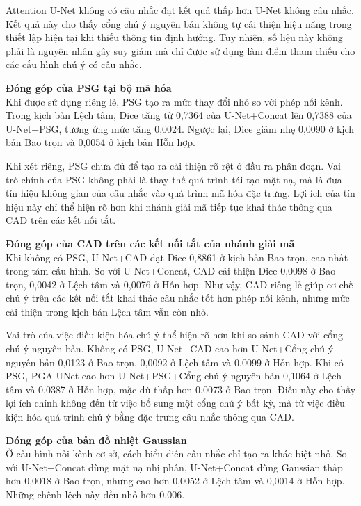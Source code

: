 Attention U-Net không có câu nhắc đạt kết quả thấp hơn U-Net không câu nhắc. Kết quả này cho thấy cổng chú ý nguyên bản không tự cải thiện hiệu năng trong thiết lập hiện tại khi thiếu thông tin định hướng. Tuy nhiên, số liệu này không phải là nguyên nhân gây suy giảm mà chỉ được sử dụng làm điểm tham chiếu cho các cấu hình chú ý có câu nhắc.

\noindent\textbf{Đóng góp của PSG tại bộ mã hóa}\\
Khi được sử dụng riêng lẻ, PSG tạo ra mức thay đổi nhỏ so với phép nối kênh. Trong kịch bản Lệch tâm, Dice tăng từ 0,7364 của U-Net+Concat lên 0,7388 của U-Net+PSG, tương ứng mức tăng 0,0024. Ngược lại, Dice giảm nhẹ 0,0090 ở kịch bản Bao trọn và 0,0054 ở kịch bản Hỗn hợp.

Khi xét riêng, PSG chưa đủ để tạo ra cải thiện rõ rệt ở đầu ra phân đoạn. Vai trò chính của PSG không phải là thay thế quá trình tái tạo mặt nạ, mà là đưa tín hiệu không gian của câu nhắc vào quá trình mã hóa đặc trưng. Lợi ích của tín hiệu này chỉ thể hiện rõ hơn khi nhánh giải mã tiếp tục khai thác thông qua CAD trên các kết nối tắt.

\noindent\textbf{Đóng góp của CAD trên các kết nối tắt của nhánh giải mã}\\
Khi không có PSG, U-Net+CAD đạt Dice 0,8861 ở kịch bản Bao trọn, cao nhất trong tám cấu hình. So với U-Net+Concat, CAD cải thiện Dice 0,0098 ở Bao trọn, 0,0042 ở Lệch tâm và 0,0076 ở Hỗn hợp. Như vậy, CAD riêng lẻ giúp cơ chế chú ý trên các kết nối tắt khai thác câu nhắc tốt hơn phép nối kênh, nhưng mức cải thiện trong kịch bản Lệch tâm vẫn còn nhỏ.

Vai trò của việc điều kiện hóa chú ý thể hiện rõ hơn khi so sánh CAD với cổng chú ý nguyên bản. Không có PSG, U-Net+CAD cao hơn U-Net+Cổng chú ý nguyên bản 0,0123 ở Bao trọn, 0,0092 ở Lệch tâm và 0,0099 ở Hỗn hợp. Khi có PSG, PGA-UNet cao hơn U-Net+PSG+Cổng chú ý nguyên bản 0,1064 ở Lệch tâm và 0,0387 ở Hỗn hợp, mặc dù thấp hơn 0,0073 ở Bao trọn. Điều này cho thấy lợi ích chính không đến từ việc bổ sung một cổng chú ý bất kỳ, mà từ việc điều kiện hóa quá trình chú ý bằng đặc trưng câu nhắc thông qua CAD.

\noindent\textbf{Đóng góp của bản đồ nhiệt Gaussian}\\
Ở cấu hình nối kênh cơ sở, cách biểu diễn câu nhắc chỉ tạo ra khác biệt nhỏ. So với U-Net+Concat dùng mặt nạ nhị phân, U-Net+Concat dùng Gaussian thấp hơn 0,0018 ở Bao trọn, nhưng cao hơn 0,0052 ở Lệch tâm và 0,0014 ở Hỗn hợp. Những chênh lệch này đều nhỏ hơn 0,006.

